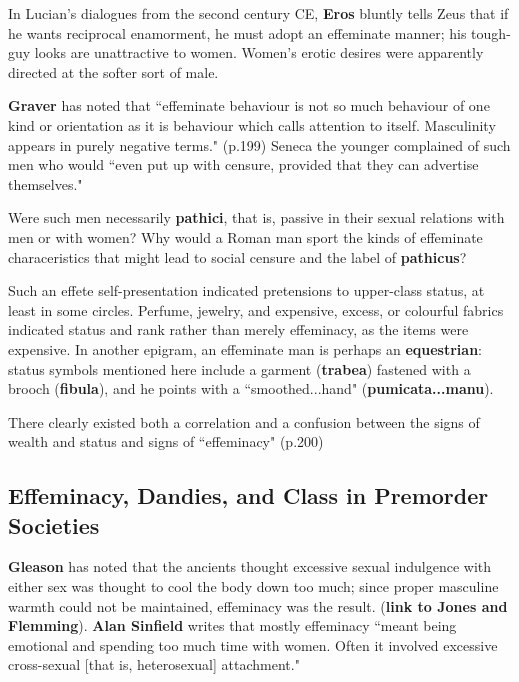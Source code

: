 \begin{rmk}
    In Lucian's dialogues from the second century CE, \textbf{Eros} bluntly tells Zeus that if he wants reciprocal enamorment, he must adopt an effeminate manner; his tough-guy looks are unattractive to women. Women's erotic desires were apparently directed at the softer sort of male.
\end{rmk}

\textbf{Graver} has noted that ``effeminate behaviour is not so much behaviour of one kind or orientation as it is behaviour which calls attention to itself. Masculinity appears in purely negative terms." (p.199) Seneca the younger complained of such men who would ``even put up with censure, provided that they can advertise themselves."

\begin{qst}
    Were such men necessarily \textbf{pathici}, that is, passive in their sexual relations with men or with women? Why would a Roman man sport the kinds of effeminate characeristics that might lead to social censure and the label of \textbf{pathicus}?
\end{qst}

Such an effete self-presentation indicated pretensions to upper-class status, at least in some circles. Perfume, jewelry, and expensive, excess, or colourful fabrics indicated status and rank rather than merely effeminacy, as the items were expensive. In another epigram, an effeminate man is perhaps an \textbf{equestrian}: status symbols mentioned here include a garment (\textbf{trabea}) fastened with a brooch (\textbf{fibula}), and he points with a ``smoothed...hand" (\textbf{pumicata...manu}). 

\begin{nte}
    There clearly existed both a correlation and a confusion between the signs of wealth and status and signs of ``effeminacy" (p.200)
\end{nte}

\subsection{Effeminacy, Dandies, and Class in Premorder Societies}

\textbf{Gleason} has noted that the ancients thought excessive sexual indulgence with either sex was thought to cool the body down too much; since proper masculine warmth could not be maintained, effeminacy was the result. (\textbf{link to Jones and Flemming}). \textbf{Alan Sinfield} writes that mostly effeminacy ``meant being emotional and spending too much time with women. Often it involved excessive cross-sexual [that is, heterosexual] attachment."

